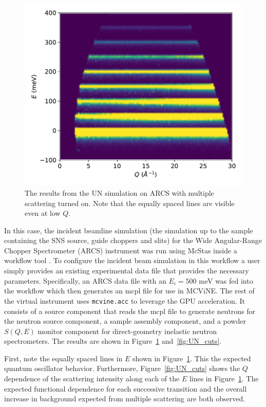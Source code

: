 \begin{figure}[h]
\centering
\includegraphics[width=\columnwidth]{figures/UN-ARCS-iqe.pdf}
\caption{The results from the UN simulation on ARCS with multiple scattering turned on.  Note that the equally spaced lines are visible even at low $Q$.}
\label{fig:UN_plot}
\end{figure}

In this case, the incident beamline simulation (the simulation up to the sample containing the SNS source, guide choppers and slits) for the Wide Angular-Range Chopper Spectrometer (ARCS) instrument \cite{abernathy2012arcs, stone2014comparison} was run using McStas \cite{Willendrup:2020aa,Willendrup:2021aa} inside a workflow tool \cite{10.1007/978-3-031-23606-8_9}.
To configure the incident beam simulation in this workflow a user simply provides an existing experimental data file that provides the necessary parameters.
Specifically, an ARCS data file with an $E_i = 500$ meV was fed into the workflow which then generates an mcpl \cite{KITTELMANN201717} file \cite{data_doi} for use in MCViNE.
The rest of the virtual instrument uses \texttt{mcvine.acc} to leverage the GPU acceleration. It consists of a source component that reads the mcpl file to generate neutrons for the neutron source component,  a sample assembly component, and a powder $S(Q, E)$ monitor component for direct-geometry inelastic neutron spectrometers.
The results are shown in Figure~\ref{fig:UN_plot} and~\ref{fig:UN_cuts}.

First, note the equally spaced lines in $E$ shown in Figure~\ref{fig:UN_plot}. This the expected quantum oscillator behavior.
Furthermore, Figure~\ref{fig:UN_cuts} shows the $Q$ dependence of the scattering intensity along each of the $E$ lines in Figure~\ref{fig:UN_plot}.
The expected functional dependence for each successive transition and the overall increase in background expected from multiple scattering are both observed.

